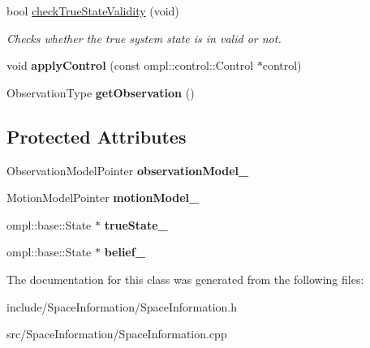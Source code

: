 \begin{DoxyCompactItemize}
\item 
\hypertarget{classfirm_1_1_space_information_ac797bd135e3b1ccfa4638a10b413a69d}{bool \hyperlink{classfirm_1_1_space_information_ac797bd135e3b1ccfa4638a10b413a69d}{check\-True\-State\-Validity} (void)}\label{classfirm_1_1_space_information_ac797bd135e3b1ccfa4638a10b413a69d}

\begin{DoxyCompactList}\small\item\em \-Checks whether the true system state is in valid or not. \end{DoxyCompactList}\item 
\hypertarget{classfirm_1_1_space_information_a2cd7942090ff17d9ced900852c4a4955}{void {\bfseries apply\-Control} (const ompl\-::control\-::\-Control $\ast$control)}\label{classfirm_1_1_space_information_a2cd7942090ff17d9ced900852c4a4955}

\item 
\hypertarget{classfirm_1_1_space_information_a3295c828328cbe15dbfdac3c28cd5ccf}{\-Observation\-Type {\bfseries get\-Observation} ()}\label{classfirm_1_1_space_information_a3295c828328cbe15dbfdac3c28cd5ccf}

\end{DoxyCompactItemize}
\subsection*{\-Protected \-Attributes}
\begin{DoxyCompactItemize}
\item 
\hypertarget{classfirm_1_1_space_information_a08dae2888a6ab7e571c89b2a020b175e}{\-Observation\-Model\-Pointer {\bfseries observation\-Model\-\_\-}}\label{classfirm_1_1_space_information_a08dae2888a6ab7e571c89b2a020b175e}

\item 
\hypertarget{classfirm_1_1_space_information_ae911ad91e06bb1eda831c4f7626d0a0e}{\-Motion\-Model\-Pointer {\bfseries motion\-Model\-\_\-}}\label{classfirm_1_1_space_information_ae911ad91e06bb1eda831c4f7626d0a0e}

\item 
\hypertarget{classfirm_1_1_space_information_ada09e25b5d7ff71df94ed2ea85dcb814}{ompl\-::base\-::\-State $\ast$ {\bfseries true\-State\-\_\-}}\label{classfirm_1_1_space_information_ada09e25b5d7ff71df94ed2ea85dcb814}

\item 
\hypertarget{classfirm_1_1_space_information_a14f18dfbbb3a3a6329309752fb5d2f23}{ompl\-::base\-::\-State $\ast$ {\bfseries belief\-\_\-}}\label{classfirm_1_1_space_information_a14f18dfbbb3a3a6329309752fb5d2f23}

\end{DoxyCompactItemize}


\-The documentation for this class was generated from the following files\-:\begin{DoxyCompactItemize}
\item 
include/\-Space\-Information/\-Space\-Information.\-h\item 
src/\-Space\-Information/\-Space\-Information.\-cpp\end{DoxyCompactItemize}
